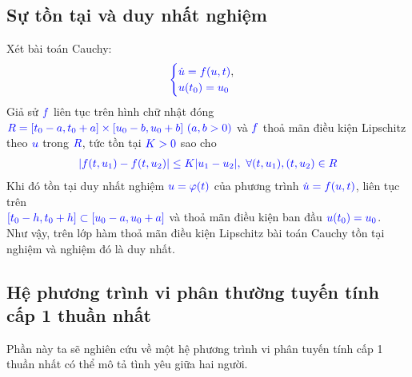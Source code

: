 \documentclass[a4paper]{article}
\begin{document}
    \subsection{Sự tồn tại và duy nhất nghiệm}
    Xét bài toán Cauchy:
    \begin{align*}
        \textcolor{blue}{
        \begin{cases}
            \dot u = f(u, t) \textcolor{black}{,} \\
            u(t_{0}) = u_{0}
        \end{cases}}
    \end{align*}
    Giả sử $\textcolor{blue}{f}$ liên tục trên hình chữ nhật đóng $\textcolor{blue}{R = [t_{0} - a, t_{0} + a] \times [u_{0} - b, u_{0} + b] \ (a, b > 0)}$ và $\textcolor{blue}{f}$ thoả mãn điều kiện Lipschitz theo $\textcolor{blue}{u}$ trong $\textcolor{blue}{R}$, tức tồn tại $\textcolor{blue}{K > 0}$ sao cho
    \begin{align*}
    \textcolor{blue}{
        |f(t, u_{1}) - f(t, u_{2})| \leq K|u_{1} - u_{2}|, \ \forall (t, u_{1}), (t, u_{2}) \in R
    }
    \end{align*}
    Khi đó tồn tại duy nhất nghiệm $\textcolor{blue}{u = \varphi (t)}$ của phương trình $\textcolor{blue}{\dot u = f(u, t)}$, liên tục trên \\ $\textcolor{blue}{[t_{0} - h, t_{0} + h] \subset [u_{0} - a, u_{0} + a]}$ và thoả mãn điều kiện ban đầu $\textcolor{blue}{u(t_{0}) = u_{0}}$.\\
    
    Như vậy, trên lớp hàm thoả mãn điều kiện Lipschitz bài toán Cauchy tồn tại nghiệm và nghiệm đó là duy nhất.

	\subsection{Hệ phương trình vi phân thường tuyến tính cấp 1 thuần nhất}
	Phần này ta sẽ nghiên cứu về một hệ phương trình vi phân tuyến tính cấp 1 thuần nhất có thể mô tả tình yêu giữa hai người.
\end{document}
